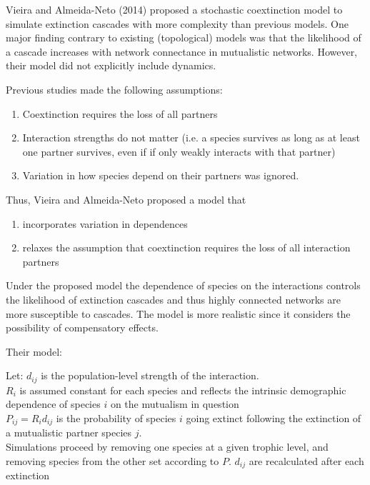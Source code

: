 \documentclass[12pt]{article}
\begin{document}
Vieira and Almeida-Neto (2014) proposed a stochastic coextinction model to simulate extinction cascades with more complexity than previous models. One major finding contrary to existing (topological) models was that the likelihood of a cascade increases with network connectance in mutualistic networks. However, their model did not explicitly include dynamics. %



Previous studies made the following assumptions:
\begin{enumerate}
	\item Coextinction requires the loss of all partners
	\item Interaction strengths do not matter (i.e. a species survives as long as at least one partner survives, even if if only weakly interacts with that partner)
	\item Variation in how species depend on their partners was ignored. %
\end{enumerate}

Thus, Vieira and Almeida-Neto proposed a model that
\begin{enumerate}
	\item incorporates variation in dependences
	\item relaxes the assumption that coextinction requires the loss of all interaction partners
\end{enumerate}

Under the proposed model the dependence of species on the interactions controls the likelihood of extinction cascades and thus highly connected networks are more susceptible to cascades. The model is more realistic since it considers the possibility of compensatory effects.

Their model:

Let:
$d_{ij}$ is the population-level strength of the interaction.\\
$R_i$ is assumed constant for each species and reflects the intrinsic demographic dependence of species $i$ on the mutualism in question\\
$P_{ij} = R_i d_{ij}$ is the probability of species $i$ going extinct following the extinction of a mutualistic partner species $j$.\\

Simulations proceed by removing one species at a given trophic level, and removing species from the other set according to $P$. $d_{ij}$ are recalculated after each extinction
\end{document}
